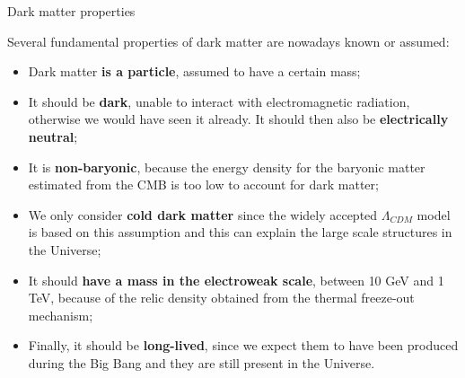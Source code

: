 \documentclass[8pt]{beamer}
\begin{document}
\begin{frame}{Dark matter properties}
\justifying

\alert{Several fundamental properties of dark matter} are nowadays known or assumed:

\begin{itemize}
\justifying
\item Dark matter \textbf{is a particle}, assumed to have a certain mass;
\item It should be \textbf{dark}, unable to interact with electromagnetic radiation, otherwise we would have seen it already. It should then also be \textbf{electrically neutral};
\item It is \textbf{non-baryonic}, because the energy density for the baryonic matter estimated from the CMB is too low to account for dark matter;
\item We only consider \textbf{cold dark matter} since the widely accepted $\Lambda_{CDM}$ model is based on this assumption and this can explain the large scale structures in the Universe;
\item It should \textbf{have a mass in the electroweak scale}, between 10 GeV and 1 TeV, because of the relic density obtained from the thermal freeze-out mechanism;%
\item Finally, it should be \textbf{long-lived}, since we expect them to have been produced during the Big Bang and they are still present in the Universe.
\end{itemize}

\end{frame}
\end{document}
